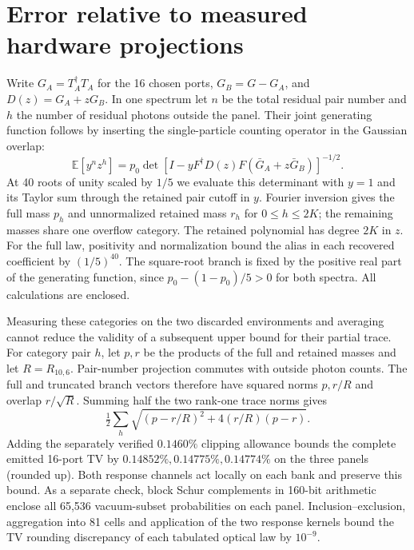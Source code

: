 \documentclass[11pt]{article}
\newcommand{\E}{\mathbb{E}}
\begin{document}
\section{Error relative to measured hardware projections}\label{sec:panelcert}
Write $G_A=T_A^\dagger T_A$ for the 16 chosen ports, $G_B=G-G_A$, and $D(z)=G_A+zG_B$. In one spectrum let $n$ be the total residual pair number and $h$ the number of residual photons outside the panel. Their joint generating function follows by inserting the single-particle counting operator in the Gaussian overlap:
\[
 \E[y^n z^h]=p_0\det[I-y F^\dagger D(z)F(\bar G_A+z\bar G_B)]^{-1/2}.
\]
At 40 roots of unity scaled by $1/5$ we evaluate this determinant with $y=1$ and its Taylor sum through the retained pair cutoff in $y$. Fourier inversion gives the full mass $p_h$ and unnormalized retained mass $r_h$ for $0\le h\le2K$; the remaining masses share one overflow category. The retained polynomial has degree $2K$ in $z$. For the full law, positivity and normalization bound the alias in each recovered coefficient by $(1/5)^{40}$. The square-root branch is fixed by the positive real part of the generating function, since $p_0-(1-p_0)/5>0$ for both spectra. All calculations are enclosed.

Measuring these categories on the two discarded environments and averaging cannot reduce the validity of a subsequent upper bound for their partial trace. For category pair $h$, let $p,r$ be the products of the full and retained masses and let $R=R_{10,6}$. Pair-number projection commutes with outside photon counts. The full and truncated branch vectors therefore have squared norms $p,r/R$ and overlap $r/\sqrt R$. Summing half the two rank-one trace norms gives
\[
 \tfrac12\sum_h\sqrt{(p-r/R)^2+4(r/R)(p-r)}.
\]
Adding the separately verified $0.1460\%$ clipping allowance bounds the complete emitted 16-port TV by $0.14852\%,0.14775\%,0.14774\%$ on the three panels (rounded up). Both response channels act locally on each bank and preserve this bound. As a separate check, block Schur complements in 160-bit arithmetic enclose all 65,536 vacuum-subset probabilities on each panel. Inclusion--exclusion, aggregation into 81 cells and application of the two response kernels bound the TV rounding discrepancy of each tabulated optical law by $10^{-9}$.
\end{document}
